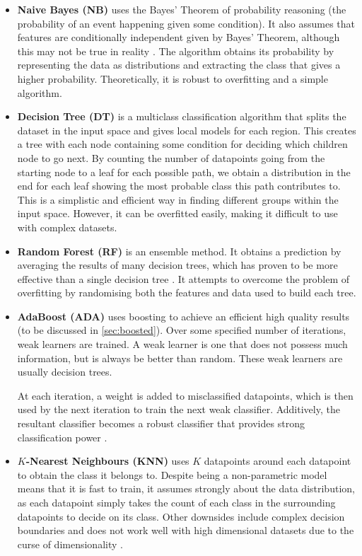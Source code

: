 \begin{itemize}
  \item \textbf{Naive Bayes (NB)} uses the Bayes' Theorem of probability reasoning (the probability of an event happening given some condition). It also assumes that features are conditionally independent given by Bayes' Theorem, although this may not be true in reality \cite{mur-book}. The algorithm obtains its probability by representing the data as distributions and extracting the class that gives a higher probability. Theoretically, it is robust to overfitting and a simple algorithm.

  \item \textbf{Decision Tree (DT)} is a multiclass classification algorithm that splits the dataset in the input space and gives local models for each region. This creates a tree with each node containing some condition for deciding which children node to go next. By counting the number of datapoints going from the starting node to a leaf for each possible path, we obtain a distribution in the end for each leaf showing the most probable class this path contributes to. This is a simplistic and efficient way in finding different groups within the input space. However, it can be overfitted easily, making it difficult to use with complex datasets. \cite{mur-book}

  \item \textbf{Random Forest (RF)} is an ensemble method. It obtains a prediction by averaging the results of many decision trees, which has proven to be more effective than a single decision tree \cite{compare-supervised}. It attempts to overcome the problem of overfitting by randomising both the features and data used to build each tree.

  \item \textbf{AdaBoost (ADA)} uses boosting to achieve an efficient high quality results (to be discussed in \autoref{sec:boosted}). Over some specified number of iterations, weak learners are trained. A weak learner is one that does not possess much information, but is always be better than random. These weak learners are usually decision trees. 
    
At each iteration, a weight is added to misclassified datapoints, which is then used by the next iteration to train the next weak classifier. Additively, the resultant classifier becomes a robust classifier that provides strong classification power \cite{boosting}.

  \item \textbf{$K$-Nearest Neighbours (KNN)} uses $K$ datapoints around each datapoint to obtain the class it belongs to. Despite being a non-parametric model means that it is fast to train, it assumes strongly about the data distribution, as each datapoint simply takes the count of each class in the surrounding datapoints to decide on its class. Other downsides include complex decision boundaries and does not work well with high dimensional datasets due to the curse of dimensionality \cite{mur-book}. 


\end{itemize}
